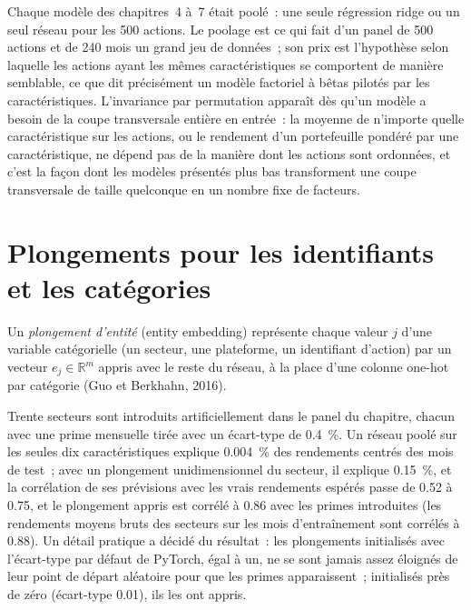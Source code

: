Chaque modèle des chapitres~4 à~7 était poolé~: une seule régression ridge ou un seul réseau pour les 500 actions. Le poolage est ce qui fait
d'un panel de 500 actions et de 240 mois un grand jeu de données~; son prix est l'hypothèse selon laquelle les actions
ayant les mêmes caractéristiques se comportent de manière semblable, ce que dit précisément un modèle factoriel à bêtas pilotés par les caractéristiques.
L'invariance par permutation apparaît dès qu'un modèle a besoin de la coupe transversale entière en entrée~: la moyenne de n'importe quelle caractéristique sur
les actions, ou le rendement d'un portefeuille pondéré par une caractéristique, ne dépend pas de la manière dont les actions sont ordonnées, et c'est
la façon dont les modèles présentés plus bas transforment une coupe transversale de taille quelconque en un nombre fixe de facteurs.

\section{Plongements pour les identifiants et les catégories}

\begin{definition}\label{def:ml:cross-sectional-deep-models:embedding}
Un \emph{plongement d'entité} (entity embedding) représente chaque valeur $j$ d'une variable catégorielle (un secteur, une
plateforme, un identifiant d'action) par un vecteur $e_j\in\mathbb R^m$ appris avec le reste du réseau, à la place d'une colonne one-hot
par catégorie (Guo et Berkhahn, 2016).
\end{definition}

Trente secteurs sont introduits artificiellement dans le panel du chapitre, chacun avec une prime mensuelle tirée avec un écart-type
de 0.4~\%. Un réseau poolé sur les seules dix caractéristiques explique 0.004~\% des rendements centrés des mois de test~; avec un
plongement unidimensionnel du secteur, il explique 0.15~\%, et la corrélation de ses prévisions
avec les vrais rendements espérés passe de 0.52 à 0.75, et le plongement appris est corrélé à 0.86 avec les
primes introduites (les rendements moyens bruts des secteurs sur les mois d'entraînement sont corrélés à 0.88). Un détail pratique
a décidé du résultat~: les plongements initialisés avec l'écart-type par défaut de PyTorch, égal à un, ne se sont jamais assez éloignés
de leur point de départ aléatoire pour que les primes apparaissent~; initialisés près de zéro (écart-type 0.01), ils les ont appris.

